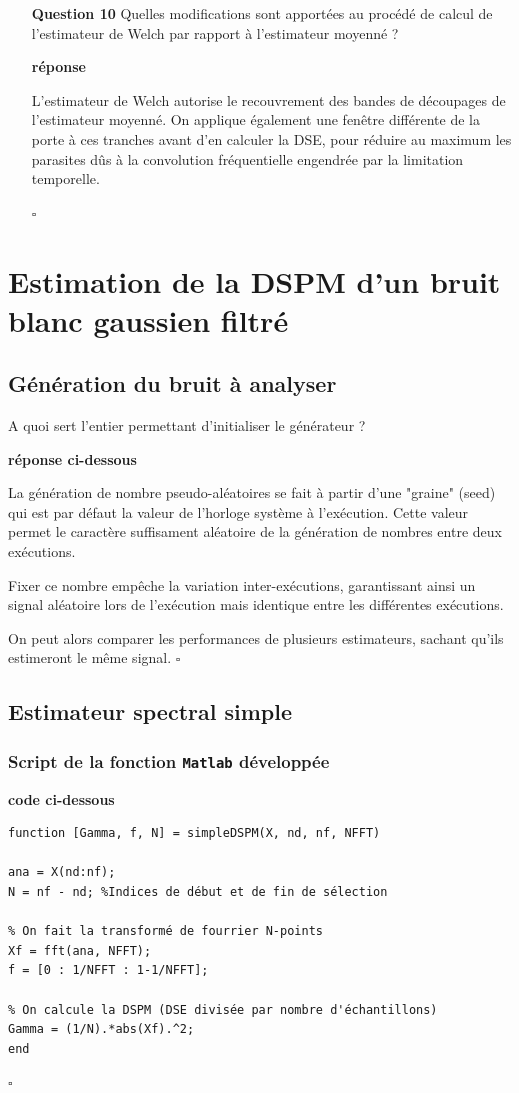 \documentclass{article}
\newcommand{\debutrep}[1]{\color{blue}\begin{center} \hrulefill \textbf{ #1 } \hrulefill \end{center} }
\newcommand{\finrep}{\vspace*{5mm}\hfill $\square$\color{black}\vspace*{5mm}}
\begin{document}
\begin{itemize}
\item[{\bf Question 10}] Quelles modifications sont apportées au procédé de calcul de l’estimateur de Welch par rapport à l’estimateur moyenné ?

\debutrep{réponse}

L'estimateur de Welch autorise le recouvrement des bandes de découpages de l'estimateur moyenné. On applique également une fenêtre différente de la porte à ces tranches avant d'en calculer la DSE, pour réduire au maximum les parasites dûs à la convolution fréquentielle engendrée par la limitation temporelle.

\finrep

\end{itemize}

\clearpage
\setcounter{section}{2}
\section{Estimation de la DSPM d'un bruit blanc gaussien filtré}
\subsection{Génération du bruit à analyser}

A quoi sert l'entier permettant d'initialiser le générateur ?

\debutrep{réponse ci-dessous}
La génération de nombre pseudo-aléatoires se fait à partir d'une "graine" (seed) qui est par défaut la valeur de l'horloge système à l'exécution. Cette valeur permet le caractère suffisament aléatoire de la génération de nombres entre deux exécutions.

Fixer ce nombre empêche la variation inter-exécutions, garantissant ainsi un signal aléatoire lors de l'exécution mais identique entre les différentes exécutions.

On peut alors comparer les performances de plusieurs estimateurs, sachant qu'ils estimeront le même signal.
\finrep

\subsection{Estimateur spectral simple}
\subsubsection{Script de la fonction {\tt Matlab} développée}

\debutrep{code ci-dessous}
\begin{verbatim}
function [Gamma, f, N] = simpleDSPM(X, nd, nf, NFFT)

ana = X(nd:nf);
N = nf - nd; %Indices de début et de fin de sélection

% On fait la transformé de fourrier N-points
Xf = fft(ana, NFFT);
f = [0 : 1/NFFT : 1-1/NFFT];

% On calcule la DSPM (DSE divisée par nombre d'échantillons)
Gamma = (1/N).*abs(Xf).^2;
end
\end{verbatim}
\finrep
\end{document}
